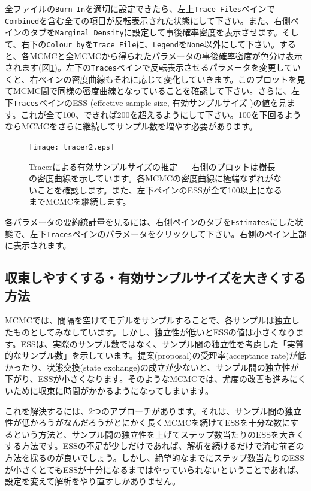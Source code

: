 \documentclass[titlepage,10pt,a4paper]{jsbook}
\begin{document}
全ファイルの\texttt{Burn-In}を適切に設定できたら、左上\texttt{Trace Files}ペインで\texttt{Combined}を含む全ての項目が反転表示された状態にして下さい。また、右側ペインのタブを\texttt{Marginal Density}に設定して事後確率密度を表示させます。そして、右下の\texttt{Colour by}を\texttt{Trace File}に、\texttt{Legend}を\texttt{None}以外にして下さい。すると、各MCMCと全MCMCから得られたパラメータの事後確率密度が色分け表示されます(図\ref{figure:ESS})。左下の\texttt{Traces}ペインで反転表示させるパラメータを変更していくと、右ペインの密度曲線もそれに応じて変化していきます。このプロットを見てMCMC間で同様の密度曲線となっていることを確認して下さい。さらに、左下\texttt{Traces}ペインのESS (effective sample size, 有効サンプルサイズ \citep{Kass1998})の値を見ます。これが全て100、できれば200を超えるようにして下さい。100を下回るようならMCMCをさらに継続してサンプル数を増やす必要があります。
\begin{figure}[h]
\begin{center}
\caption{Tracerによる有効サンプルサイズの推定 --- 右側のプロットは樹長の密度曲線を示しています。各MCMCの密度曲線に極端なずれがないことを確認します。また、左下ペインのESSが全て100以上になるまでMCMCを継続します。}\label{figure:ESS}
\texttt{[image: tracer2.eps]}
\end{center}
\end{figure}

各パラメータの要約統計量を見るには、右側ペインのタブを\texttt{Estimates}にした状態で、左下\texttt{Traces}ペインのパラメータをクリックして下さい。右側のペイン上部に表示されます。
\subsection{収束しやすくする・有効サンプルサイズを大きくする方法}
MCMCでは、間隔を空けてモデルをサンプルすることで、各サンプルは独立したものとしてみなしています。しかし、独立性が低いとESSの値は小さくなります。ESSは、実際のサンプル数ではなく、サンプル間の独立性を考慮した「実質的なサンプル数」を示しています。提案(proposal)の受理率(acceptance rate)が低かったり、状態交換(state exchange)の成立が少ないと、サンプル間の独立性が下がり、ESSが小さくなります。そのようなMCMCでは、尤度の改善も進みにくいために収束に時間がかかるようになってしまいます。

これを解決するには、2つのアプローチがあります。それは、サンプル間の独立性が低かろうがなんだろうがとにかく長くMCMCを続けてESSを十分な数にするという方法と、サンプル間の独立性を上げてステップ数当たりのESSを大きくする方法です。ESSの不足が少しだけであれば、解析を続けるだけで済む前者の方法を採るのが良いでしょう。しかし、絶望的なまでにステップ数当たりのESSが小さくとてもESSが十分になるまではやっていられないということであれば、設定を変えて解析をやり直すしかありません。
\end{document}
